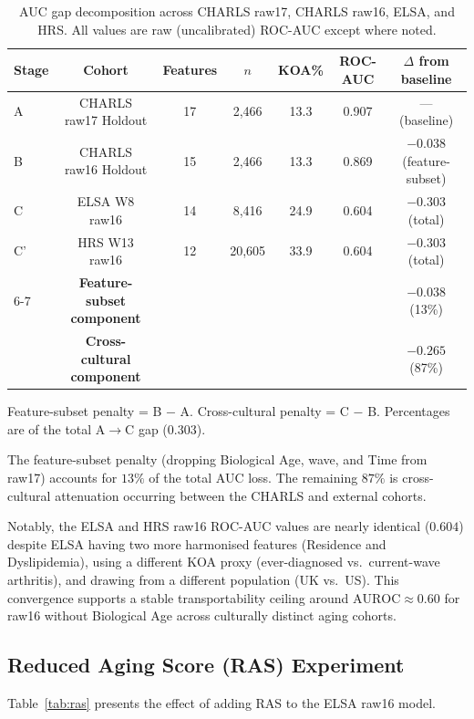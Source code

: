 \documentclass[11pt,a4paper]{article}
\begin{document}
\begin{table}[h!]
\centering
\small
\caption{AUC gap decomposition across CHARLS raw17, CHARLS raw16, ELSA, and HRS.
All values are raw (uncalibrated) ROC-AUC except where noted.}
\label{tab:auc-decomp}
\begin{tabular}{lcccccc}
\toprule
Stage & Cohort & Features & $n$ & KOA\% & ROC-AUC & $\Delta$ from baseline \\
\midrule
A  & CHARLS raw17 Holdout  & 17 & 2{,}466  & 13.3 & 0.907 & --- (baseline) \\
B  & CHARLS raw16 Holdout  & 15 & 2{,}466  & 13.3 & 0.869 & $-0.038$ (feature-subset) \\
C  & ELSA W8 raw16         & 14 & 8{,}416  & 24.9 & 0.604 & $-0.303$ (total) \\
C' & HRS W13 raw16         & 12 & 20{,}605 & 33.9 & 0.604 & $-0.303$ (total) \\
\cmidrule{6-7}
   & \textbf{Feature-subset component}  & & & & & $\mathbf{-0.038}$ (13\%) \\
   & \textbf{Cross-cultural component}  & & & & & $\mathbf{-0.265}$ (87\%) \\
\bottomrule
\end{tabular}

\vspace{4pt}
\footnotesize{Feature-subset penalty = B $-$ A. Cross-cultural penalty = C $-$ B.
Percentages are of the total A$\rightarrow$C gap ($0.303$).}
\end{table}

The feature-subset penalty (dropping Biological Age, wave, and Time from raw17)
accounts for $13\%$ of the total AUC loss. The remaining $87\%$ is cross-cultural
attenuation occurring between the CHARLS and external cohorts.

Notably, the ELSA and HRS raw16 ROC-AUC values are nearly identical ($0.604$)
despite ELSA having two more harmonised features (Residence and Dyslipidemia), using
a different KOA proxy (ever-diagnosed vs.\ current-wave arthritis), and drawing from
a different population (UK vs.\ US). This convergence supports a stable transportability
ceiling around $\text{AUROC} \approx 0.60$ for raw16 without Biological Age across
culturally distinct aging cohorts.

\subsection{Reduced Aging Score (RAS) Experiment}

Table~\ref{tab:ras} presents the effect of adding RAS to the ELSA raw16 model.
\end{document}
